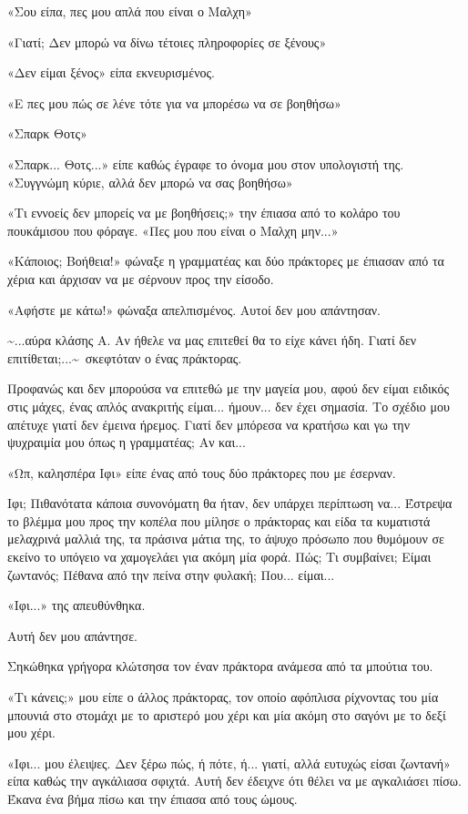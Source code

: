\documentclass[12pt,twoside, openany]{book}
\begin{document}
«Σου είπα, πες μου απλά που είναι ο Μαλχη»

«Γιατί; Δεν μπορώ να δίνω τέτοιες πληροφορίες σε ξένους»

«Δεν είμαι ξένος» είπα εκνευρισμένος.

«Ε πες μου πώς σε λένε τότε για να μπορέσω να σε βοηθήσω»

«Σπαρκ Θοτς»

«Σπαρκ... Θοτς...» είπε καθώς έγραφε το όνομα μου στον υπολογιστή της. «Συγγνώμη κύριε, αλλά δεν μπορώ να σας βοηθήσω»

«Τι εννοείς δεν μπορείς να με βοηθήσεις;» την έπιασα από το κολάρο του πουκάμισου που φόραγε. «Πες μου που είναι ο Μαλχη μην...»

«Κάποιος; Βοήθεια!» φώναξε η γραμματέας και δύο πράκτορες με έπιασαν από τα χέρια και άρχισαν να με σέρνουν προς την είσοδο.

«Αφήστε με κάτω!» φώναξα απελπισμένος. Αυτοί δεν μου απάντησαν.

\textasciitilde ...αύρα κλάσης Α. Αν ήθελε να μας επιτεθεί θα το είχε κάνει ήδη. Γιατί δεν επιτίθεται;...\textasciitilde \  σκεφτόταν ο ένας πράκτορας.

Προφανώς και δεν μπορούσα να επιτεθώ με την μαγεία μου, αφού δεν είμαι ειδικός στις μάχες, ένας απλός ανακριτής είμαι... ήμουν... δεν έχει σημασία. Το σχέδιο μου απέτυχε γιατί δεν έμεινα ήρεμος. Γιατί δεν μπόρεσα να κρατήσω και γω την ψυχραιμία μου όπως η γραμματέας; Αν και...

«Ωπ, καλησπέρα Ιφι» είπε ένας από τους δύο πράκτορες που με έσερναν.

Ιφι; Πιθανότατα κάποια συνονόματη θα ήταν, δεν υπάρχει περίπτωση να... Έστρεψα το βλέμμα μου προς την κοπέλα που μίλησε ο πράκτορας και είδα τα κυματιστά μελαχρινά μαλλιά της, τα πράσινα μάτια της, το άψυχο πρόσωπο που θυμόμουν σε εκείνο το υπόγειο να χαμογελάει για ακόμη μία φορά. Πώς; Τι συμβαίνει; Είμαι ζωντανός; Πέθανα από την πείνα στην φυλακή; Που... είμαι...

«Ιφι...» της απευθύνθηκα.

Αυτή δεν μου απάντησε.

Σηκώθηκα γρήγορα κλώτσησα τον έναν πράκτορα ανάμεσα από τα μπούτια του.

«Τι κάνεις;» μου είπε ο άλλος πράκτορας, τον οποίο αφόπλισα ρίχνοντας του μία μπουνιά στο στομάχι με το αριστερό μου χέρι και μία ακόμη στο σαγόνι με το δεξί μου χέρι.

«Ιφι... μου έλειψες. Δεν ξέρω πώς, ή πότε, ή... γιατί, αλλά ευτυχώς είσαι ζωντανή» είπα καθώς την αγκάλιασα σφιχτά. Αυτή δεν έδειχνε ότι θέλει να με αγκαλιάσει πίσω. Έκανα ένα βήμα πίσω και την έπιασα από τους ώμους.
\end{document}
